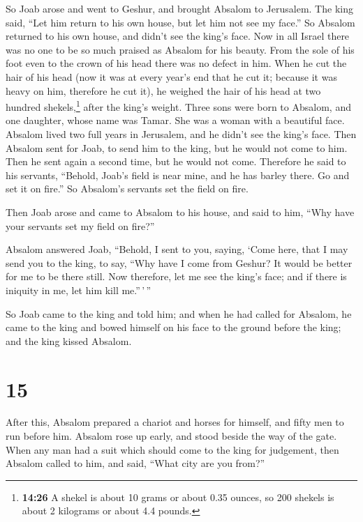 So Joab arose and went to Geshur, and brought Absalom to
Jerusalem.  The king said, ``Let him return to his own
house, but let him not see my face.'' So Absalom returned to his own
house, and didn't see the king's face.  Now in all Israel
there was no one to be so much praised as Absalom for his beauty. From
the sole of his foot even to the crown of his head there was no defect
in him.  When he cut the hair of his head (now it was at
every year's end that he cut it; because it was heavy on him, therefore
he cut it), he weighed the hair of his head at two hundred
shekels,\footnote{\textbf{14:26} A shekel is about 10 grams or about
  0.35 ounces, so 200 shekels is about 2 kilograms or about 4.4 pounds.}
after the king's weight.  Three sons were born to
Absalom, and one daughter, whose name was Tamar. She was a woman with a
beautiful face.  Absalom lived two full years in
Jerusalem, and he didn't see the king's face.  Then
Absalom sent for Joab, to send him to the king, but he would not come to
him. Then he sent again a second time, but he would not come.
 Therefore he said to his servants, ``Behold, Joab's
field is near mine, and he has barley there. Go and set it on fire.'' So
Absalom's servants set the field on fire.

 Then Joab arose and came to Absalom to his house, and
said to him, ``Why have your servants set my field on fire?''

 Absalom answered Joab, ``Behold, I sent to you, saying,
`Come here, that I may send you to the king, to say, ``Why have I come
from Geshur? It would be better for me to be there still. Now therefore,
let me see the king's face; and if there is iniquity in me, let him kill
me.''\,'\,''

 So Joab came to the king and told him; and when he had
called for Absalom, he came to the king and bowed himself on his face to
the ground before the king; and the king kissed Absalom.

\hypertarget{section-14}{%
\section{15}\label{section-14}}

 After this, Absalom prepared a chariot and horses for
himself, and fifty men to run before him.  Absalom rose up
early, and stood beside the way of the gate. When any man had a suit
which should come to the king for judgement, then Absalom called to him,
and said, ``What city are you from?''

